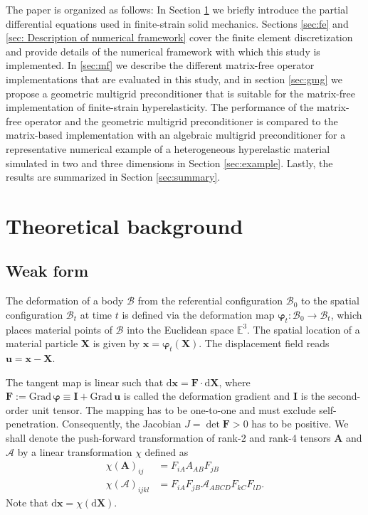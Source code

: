 \documentclass[times,doublespace]{nmeauth}
\newcommand*{\gz}[1]{\boldsymbol{#1}}
\newcommand*{\Grad}{\mathrm{Grad}}
\renewcommand*{\d}{\mathrm{d}}
\newcommand*{\mcl}[1]{\mathcal{#1}}
\begin{document}
The paper is organized as follows: In Section \ref{sec:theory} we briefly introduce the partial differential equations used in  finite-strain solid mechanics.
Sections \ref{sec:fe} and \ref{sec: Description of numerical framework} cover the finite element discretization and provide details of the numerical framework with which this study is implemented.
In \ref{sec:mf} we describe the different matrix-free operator implementations that are evaluated in this study, and in section \ref{sec:gmg} we propose a geometric multigrid preconditioner that is suitable for the matrix-free implementation of finite-strain hyperelasticity.
The performance of the matrix-free operator and the geometric multigrid preconditioner is compared to the matrix-based implementation with an algebraic multigrid preconditioner for a representative numerical example of a heterogeneous hyperelastic material simulated in two and three dimensions in Section \ref{sec:example}.
Lastly, the results are summarized in Section \ref{sec:summary}.

\section{Theoretical background}
\label{sec:theory}

\subsection{Weak form}
The deformation of a body $\mcl B$ from the referential configuration $\mcl B_0$ to the spatial configuration $\mcl B_t$ at time $t$
is defined via the deformation map $\gz \varphi_t: \mcl B_0 \rightarrow \mcl B_t$, which places material points of $\mcl B$ into the Euclidean space $\mathbb E^3$.
The spatial location of a material particle $\gz X$ is given by $\gz x = \gz \varphi_t (\gz X)$.
The displacement field reads $\gz u = \gz x - \gz X$.

The tangent map is linear such that
$\d \gz x = \gz F \cdot \d \gz X$,
where $\gz F := \Grad \, \gz \varphi \equiv \gz I + \Grad \, \gz u$ is called the deformation gradient and $\gz I$ is the second-order unit tensor.
The mapping has to be one-to-one and must exclude self-penetration. Consequently, the Jacobian $J = \det \gz F > 0$ has to be positive.
We shall denote the push-forward transformation of rank-2 and rank-4 tensors $\mathbf{A}$ and $\boldsymbol{\mathcal{A}}$ by a linear transformation $\chi$ defined as
\begin{align}
  \chi\left( \mathbf{A} \right)_{ij}
  &= F_{iA} A_{AB} F_{jB} \\
  \chi\left( \boldsymbol{\mathcal{A}} \right)_{ijkl}
  &= F_{iA} F_{jB} \mathcal{A}_{ABCD} F_{kC} F_{lD}.
\end{align}
Note that $\d \gz x = \chi(\d \gz X)$.
\end{document}
